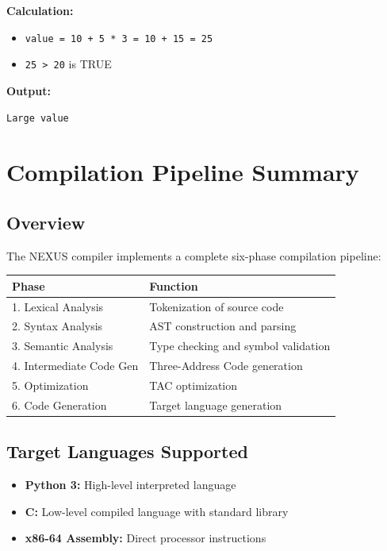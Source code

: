 \documentclass[12pt,a4paper]{report}
\begin{document}
\textbf{Calculation:}
\begin{itemize}
    \item \texttt{value = 10 + 5 * 3 = 10 + 15 = 25}
    \item \texttt{25 > 20} is TRUE
\end{itemize}

\textbf{Output:}
\begin{verbatim}
Large value
\end{verbatim}

\chapter{Compilation Pipeline Summary}

\section{Overview}

The NEXUS compiler implements a complete six-phase compilation pipeline:

\begin{center}
\begin{tabular}{|l|l|}
\hline
\textbf{Phase} & \textbf{Function} \\
\hline
1. Lexical Analysis & Tokenization of source code \\
\hline
2. Syntax Analysis & AST construction and parsing \\
\hline
3. Semantic Analysis & Type checking and symbol validation \\
\hline
4. Intermediate Code Gen & Three-Address Code generation \\
\hline
5. Optimization & TAC optimization \\
\hline
6. Code Generation & Target language generation \\
\hline
\end{tabular}
\end{center}

\section{Target Languages Supported}

\begin{itemize}
    \item \textbf{Python 3:} High-level interpreted language
    \item \textbf{C:} Low-level compiled language with standard library
    \item \textbf{x86-64 Assembly:} Direct processor instructions
\end{itemize}
\end{document}
